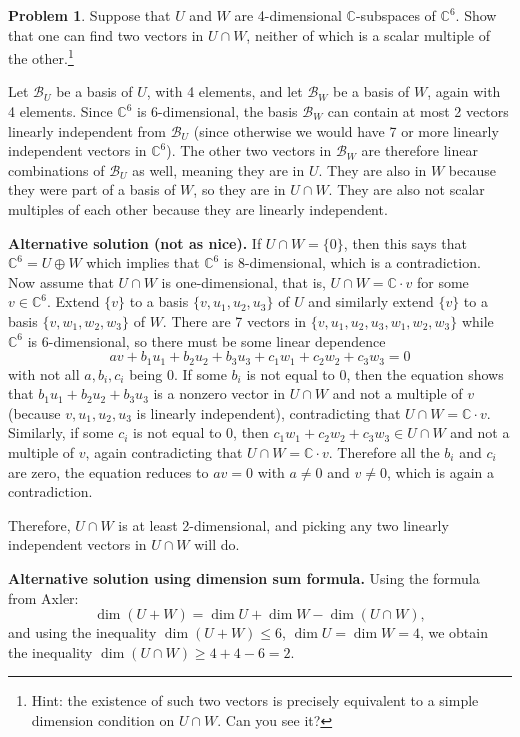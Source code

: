 \documentclass[11pt,oneside]{amsart}
\theoremstyle{definition}
\newtheorem{problem}{Problem}
\newcommand{\bC}{\mathbb{C}}
\begin{document}
    \begin{problem}
        Suppose that $U$ and $W$ are 4-dimensional $\bC$-subspaces of $\bC^6$. Show that one can find two vectors in $U\cap W$, neither of which is a scalar multiple of the other.\footnote{Hint: the existence of such two vectors is precisely equivalent to a simple dimension condition on $U\cap W$. Can you see it?}
    \end{problem}
    \begin{solution}
        Let $\mathcal B_U$ be a basis of $U$, with 4 elements, and let $\mathcal B_W$ be a basis of $W$, again with 4 elements. Since $\bC^6$ is 6-dimensional, the basis $\mathcal B_W$ can contain at most 2 vectors linearly independent from $\mathcal B_U$ (since otherwise we would have 7 or more linearly independent vectors in $\bC^6$). The other two vectors in $\mathcal B_W$ are therefore linear combinations of $\mathcal B_U$ as well, meaning they are in $U$. They are also in $W$ because they were part of a basis of $W$, so they are in $U\cap W$. They are also not scalar multiples of each other because they are linearly independent.
    \end{solution}
    \begin{solution}
        \textbf{Alternative solution (not as nice).} If $U\cap W=\{0\}$, then this says that $\bC^6=U\oplus W$ which implies that $\bC^6$ is 8-dimensional, which is a contradiction. Now assume that $U\cap W$ is one-dimensional, that is, $U\cap W=\bC\cdot v$ for some $v\in\bC^6$. Extend $\{v\}$ to a basis $\{v,u_1,u_2,u_3\}$ of $U$ and similarly extend $\{v\}$ to a basis $\{v,w_1,w_2,w_3\}$ of $W$. There are 7 vectors in $\{v,u_1,u_2,u_3,w_1,w_2,w_3\}$ while $\bC^6$ is 6-dimensional, so there must be some linear dependence
        \[av+b_1u_1+b_2u_2+b_3u_3+c_1w_1+c_2w_2+c_3w_3=0\]
        with not all $a,b_i,c_i$ being 0. If some $b_i$ is not equal to 0, then the equation shows that $b_1u_1+b_2u_2+b_3u_3$ is a nonzero vector in $U\cap W$ and not a multiple of $v$ (because $v,u_1,u_2,u_3$ is linearly independent), contradicting that $U\cap W=\bC\cdot v$. Similarly, if some $c_i$ is not equal to 0, then $c_1w_1+c_2w_2+c_3w_3\in U\cap W$ and not a multiple of $v$, again contradicting that $U\cap W=\bC\cdot v$. Therefore all the $b_i$ and $c_i$ are zero, the equation reduces to $av=0$ with $a\neq 0$ and $v\neq 0$, which is again a contradiction.

        Therefore, $U\cap W$ is at least 2-dimensional, and picking any two linearly independent vectors in $U\cap W$ will do.
    \end{solution}
    \begin{solution}
        \textbf{Alternative solution using dimension sum formula.} Using the formula from Axler:
        \[\dim(U+W)=\dim U+\dim W-\dim(U\cap W),\]
        and using the inequality $\dim(U+W)\leq 6$, $\dim U=\dim W=4$, we obtain the inequality $\dim(U\cap W)\geq 4+4-6=2$.
    \end{solution}
\end{document}
